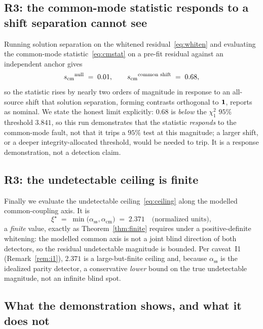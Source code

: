 \subsection{R3: the common-mode statistic responds to a shift separation cannot see}
\label{sec:demor3}

Running solution separation on the whitened residual~\eqref{eq:whiten} and
evaluating the common-mode statistic~\eqref{eq:cmstat} on a pre-fit residual against
an independent anchor gives
\begin{equation}
  s_{\mathrm{cm}}{}^{\text{null}} \;=\; 0.01,
  \qquad
  s_{\mathrm{cm}}{}^{\text{common shift}} \;=\; 0.68 ,
  \label{eq:demor3}
\end{equation}
so the statistic rises by nearly two orders of magnitude in response to an
all-source shift that solution separation, forming contrasts orthogonal to
$\bm 1{}$, reports as nominal. We state the honest limit explicitly: $0.68$ is
\emph{below} the $\chi^2_1$ $95\%$ threshold $3.841$, so this run demonstrates that
the statistic \emph{responds} to the common-mode fault, not that it trips a $95\%$
test at this magnitude; a larger shift, or a deeper integrity-allocated threshold,
would be needed to trip. It is a response demonstration, not a detection claim.

\subsection{R3: the undetectable ceiling is finite}
\label{sec:democeiling}

Finally we evaluate the undetectable ceiling~\eqref{eq:ceiling} along the modelled
common-coupling axis. It is
\begin{equation}
  \xi^\star \;=\; \min\big(\alpha_{\mathrm{ss}},\alpha_{\mathrm{cm}}\big) \;=\; 2.371
  \quad\text{(normalized units)},
  \label{eq:democeiling}
\end{equation}
a \emph{finite} value, exactly as Theorem~\ref{thm:finite} requires under a
positive-definite whitening: the modelled common axis is not a joint blind
direction of both detectors, so the residual undetectable magnitude is bounded.
Per caveat~I1 (Remark~\ref{rem:i1}), $2.371$ is a large-but-finite ceiling and,
because $\alpha_{\mathrm{ss}}$ is the idealized parity detector, a conservative
\emph{lower} bound on the true undetectable magnitude, not an infinite blind spot.

\subsection{What the demonstration shows, and what it does not}
\label{sec:demoscope}

